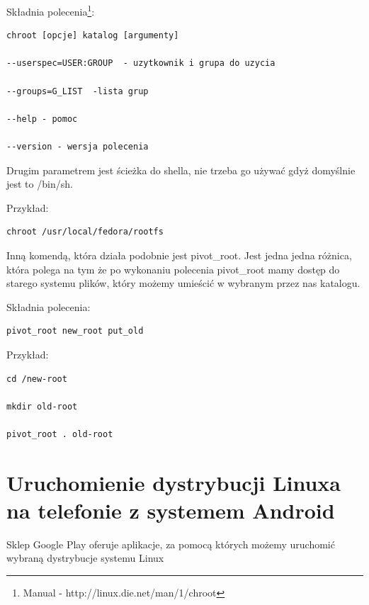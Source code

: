 Składnia polecenia\footnote{ Manual - http://linux.die.net/man/1/chroot}:
\begin{lstlisting}
chroot [opcje] katalog [argumenty]

--userspec=USER:GROUP  - uzytkownik i grupa do uzycia

--groups=G_LIST  -lista grup

--help - pomoc

--version - wersja polecenia
\end{lstlisting}
Drugim parametrem jest ścieżka do shella, nie trzeba go używać gdyż domyślnie jest to /bin/sh.

Przykład:
\begin{lstlisting}
chroot /usr/local/fedora/rootfs

\end{lstlisting}


Inną komendą, która  działa podobnie jest pivot\_root. Jest jedna jedna różnica, która polega na tym że po wykonaniu polecenia pivot\_root mamy dostęp do starego systemu plików, który możemy umieścić w wybranym przez nas katalogu.  


Składnia polecenia:
\begin{lstlisting}
pivot_root new_root put_old
\end{lstlisting}
Przykład:
\begin{lstlisting}
cd /new-root

mkdir old-root

pivot_root . old-root

\end{lstlisting}


\section{Uruchomienie dystrybucji Linuxa na telefonie z systemem Android}

Sklep Google Play oferuje aplikacje, za pomocą których możemy uruchomić wybraną dystrybucje systemu Linux 

